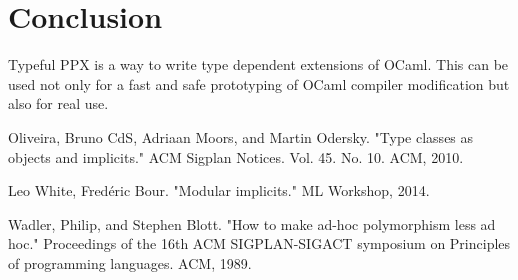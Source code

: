 \documentclass{article}
\begin{document}
\section{Conclusion}\label{conclusion}

Typeful PPX is a way to write type dependent extensions of OCaml. This
can be used not only for a fast and safe prototyping of OCaml compiler
modification but also for real use.

 
% 

\begin{thebibliography}{9}


  Oliveira, Bruno CdS, Adriaan Moors, and Martin Odersky. "Type classes as objects and implicits." ACM Sigplan Notices. Vol. 45. No. 10. ACM, 2010.

  Leo White, Fred\'eric Bour. "Modular implicits." ML Workshop, 2014.

  Wadler, Philip, and Stephen Blott. "How to make ad-hoc polymorphism less ad hoc." Proceedings of the 16th ACM SIGPLAN-SIGACT symposium on Principles of programming languages. ACM, 1989.

\end{thebibliography}
\end{document}
